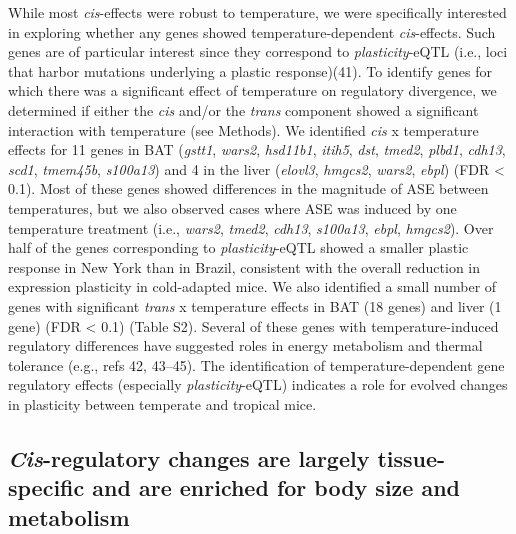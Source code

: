 \documentclass[9pt,twocolumn,twoside,lineno]{pnas-new}
\begin{document}
While most \emph{cis}-effects were robust to temperature, we were
specifically interested in exploring whether any genes showed
temperature-dependent \emph{cis}-effects. Such genes are of particular
interest since they correspond to \emph{plasticity}-eQTL (i.e., loci
that harbor mutations underlying a plastic response)(41). To identify
genes for which there was a significant effect of temperature on
regulatory divergence, we determined if either the \emph{cis} and/or the
\emph{trans} component showed a significant interaction with temperature
(see Methods). We identified \emph{cis} x temperature effects for 11
genes in BAT (\emph{gstt1}, \emph{wars2}, \emph{hsd11b1}, \emph{itih5},
\emph{dst}, \emph{tmed2}, \emph{plbd1}, \emph{cdh13}, \emph{scd1},
\emph{tmem45b}, \emph{s100a13}) and 4 in the liver (\emph{elovl3},
\emph{hmgcs2}, \emph{wars2}, \emph{ebpl}) (FDR \textless{} 0.1). Most of
these genes showed differences in the magnitude of ASE between
temperatures, but we also observed cases where ASE was induced by one
temperature treatment (i.e., \emph{wars2}, \emph{tmed2}, \emph{cdh13},
\emph{s100a13}, \emph{ebpl}, \emph{hmgcs2}). Over half of the genes
corresponding to \emph{plasticity}-eQTL showed a smaller plastic
response in New York than in Brazil, consistent with the overall
reduction in expression plasticity in cold-adapted mice. We also
identified a small number of genes with significant \emph{trans} x
temperature effects in BAT (18 genes) and liver (1 gene) (FDR
\textless{} 0.1) (Table S2). Several of these genes with
temperature-induced regulatory differences have suggested roles in
energy metabolism and thermal tolerance (e.g., refs 42, 43--45). The
identification of temperature-dependent gene regulatory effects
(especially \emph{plasticity}-eQTL) indicates a role for evolved changes
in plasticity between temperate and tropical mice.

\hypertarget{regulatory-changes-are-largely-tissue-specific-and-are-enriched-for-body-size-and-metabolism}{%
\subsection*{\texorpdfstring{\textit{Cis}-regulatory changes are largely
tissue-specific and are enriched for body size and
metabolism}{-regulatory changes are largely tissue-specific and are enriched for body size and metabolism}}\label{regulatory-changes-are-largely-tissue-specific-and-are-enriched-for-body-size-and-metabolism}}
\end{document}
